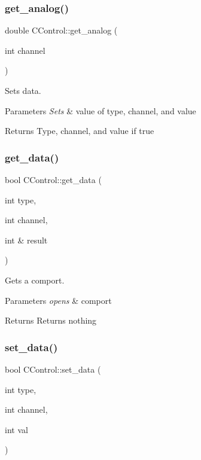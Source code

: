 \subsubsection{\texorpdfstring{get\+\_\+analog()}{get\_analog()}}
{\footnotesize\ttfamily double C\+Control\+::get\+\_\+analog (\begin{DoxyParamCaption}\item[{int}]{channel }\end{DoxyParamCaption})}

Sets data.


\begin{DoxyParams}{Parameters}
{\em Sets} & value of type, channel, and value\\
\hline
\end{DoxyParams}
\begin{DoxyReturn}{Returns}
Type, channel, and value if true 
\end{DoxyReturn}
\hypertarget{class_c_control_a0bad8e51e54cb6f1e2a7b51d3a3940d3}{}\label{class_c_control_a0bad8e51e54cb6f1e2a7b51d3a3940d3} 
\subsubsection{\texorpdfstring{get\+\_\+data()}{get\_data()}}
{\footnotesize\ttfamily bool C\+Control\+::get\+\_\+data (\begin{DoxyParamCaption}\item[{int}]{type,  }\item[{int}]{channel,  }\item[{int \&}]{result }\end{DoxyParamCaption})}

Gets a comport.


\begin{DoxyParams}{Parameters}
{\em opens} & comport\\
\hline
\end{DoxyParams}
\begin{DoxyReturn}{Returns}
Returns nothing 
\end{DoxyReturn}
\hypertarget{class_c_control_a13f557815616ef66a8f5dd4b725d8c32}{}\label{class_c_control_a13f557815616ef66a8f5dd4b725d8c32} 
\subsubsection{\texorpdfstring{set\+\_\+data()}{set\_data()}}
{\footnotesize\ttfamily bool C\+Control\+::set\+\_\+data (\begin{DoxyParamCaption}\item[{int}]{type,  }\item[{int}]{channel,  }\item[{int}]{val }\end{DoxyParamCaption})}

